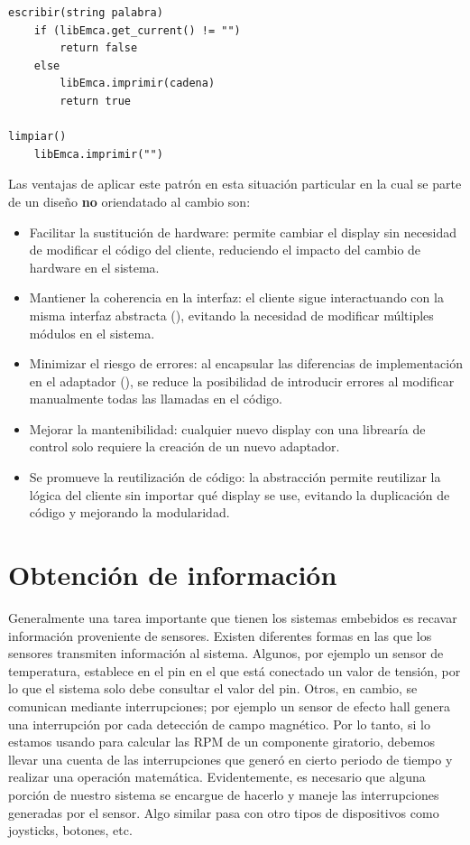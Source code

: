 \begin{lstlisting}[label={codigoAdapter}, caption=Ejemplo de implementación del módulo \ControlEmca]
escribir(string palabra)
    if (libEmca.get_current() != "")
        return false
	else
    	libEmca.imprimir(cadena)
    	return true

limpiar()
    libEmca.imprimir("")
\end{lstlisting}

Las ventajas de aplicar este patrón en esta situación particular en la cual se parte de un diseño \textbf{no} oriendatado al cambio son:

\begin{itemize}

\item Facilitar la sustitución de hardware: permite cambiar el display sin necesidad de modificar el código del cliente, reduciendo el impacto del cambio de hardware en el sistema.

\item Mantiener la coherencia en la interfaz: el cliente sigue interactuando con la misma interfaz abstracta (\Display), evitando la necesidad de modificar múltiples módulos en el sistema.

\item Minimizar el riesgo de errores: al encapsular las diferencias de implementación en el adaptador (\DisplayEmca), se reduce la posibilidad de introducir errores al modificar manualmente todas las llamadas en el código.

\item Mejorar la mantenibilidad: cualquier nuevo display con una librearía de control solo requiere la creación de un nuevo adaptador.

\item Se promueve la reutilización de código: la abstracción permite reutilizar la lógica del cliente sin importar qué display se use, evitando la duplicación de código y mejorando la modularidad.
\end{itemize}


\section{Obtención de información}
\label{obtInfo}

Generalmente una tarea importante que tienen los sistemas embebidos es recavar información proveniente de sensores. Existen diferentes formas en las que los sensores transmiten información al sistema. Algunos, por ejemplo un sensor de temperatura, establece en el pin en el que está conectado un valor de tensión, por lo que el sistema solo debe consultar el valor del pin. Otros, en cambio, se comunican mediante interrupciones; por ejemplo un sensor de efecto \gls{hall} genera una interrupción por cada detección de campo magnético. Por lo tanto, si lo estamos usando para calcular las \gls{RPM} de un componente giratorio, debemos llevar una cuenta de las interrupciones que generó en cierto periodo de tiempo y realizar una operación matemática. Evidentemente, es necesario que alguna porción de nuestro sistema se encargue de hacerlo y maneje las interrupciones generadas por el sensor. Algo similar pasa con otro tipos de dispositivos como joysticks, botones, etc.

